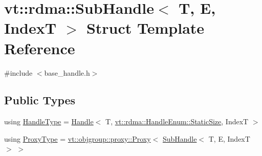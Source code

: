 \hypertarget{structvt_1_1rdma_1_1_sub_handle}{}\section{vt\+:\+:rdma\+:\+:Sub\+Handle$<$ T, E, IndexT $>$ Struct Template Reference}
\label{structvt_1_1rdma_1_1_sub_handle}


{\ttfamily \#include $<$base\+\_\+handle.\+h$>$}

\subsection*{Public Types}
\begin{DoxyCompactItemize}
\item 
using \hyperlink{structvt_1_1rdma_1_1_sub_handle_a782bd6ddc85c6a81d7f55d207fad71cd}{Handle\+Type} = \hyperlink{structvt_1_1rdma_1_1_handle}{Handle}$<$ T, \hyperlink{namespacevt_1_1rdma_a0234ff19cfb3c04718cfdfd36b2d6d88a0c5c41d6a0319a61d3a5e8a060b7c4d7}{vt\+::rdma\+::\+Handle\+Enum\+::\+Static\+Size}, IndexT $>$
\item 
using \hyperlink{structvt_1_1rdma_1_1_sub_handle_a758bee2e499658cfef92ace83eea6590}{Proxy\+Type} = \hyperlink{structvt_1_1objgroup_1_1proxy_1_1_proxy}{vt\+::objgroup\+::proxy\+::\+Proxy}$<$ \hyperlink{structvt_1_1rdma_1_1_sub_handle}{Sub\+Handle}$<$ T, E, IndexT $>$ $>$
\end{DoxyCompactItemize}
